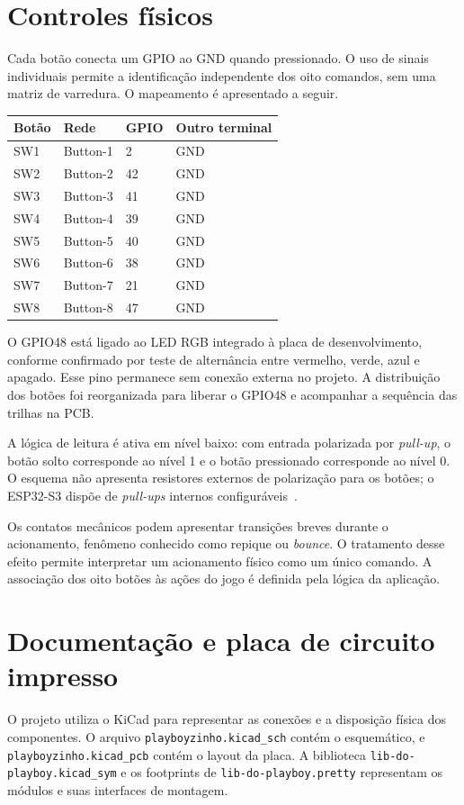 \documentclass[12pt,a4paper]{article}
\begin{document}
\section{Controles físicos}
Cada botão conecta um GPIO ao GND quando pressionado. O uso de sinais individuais permite a identificação independente dos oito comandos, sem uma matriz de varredura. O mapeamento é apresentado a seguir.
\begin{center}
  \begin{tabular}{llll}
    \toprule
    \textbf{Botão} & \textbf{Rede} & \textbf{GPIO} & \textbf{Outro terminal}\\
    \midrule
    SW1 & Button-1 & 2 & GND\\
    SW2 & Button-2 & 42 & GND\\
    SW3 & Button-3 & 41 & GND\\
    SW4 & Button-4 & 39 & GND\\
    SW5 & Button-5 & 40 & GND\\
    SW6 & Button-6 & 38 & GND\\
    SW7 & Button-7 & 21 & GND\\
    SW8 & Button-8 & 47 & GND\\
    \bottomrule
  \end{tabular}
\end{center}

O GPIO48 está ligado ao LED RGB integrado à placa de desenvolvimento, conforme confirmado por teste de alternância entre vermelho, verde, azul e apagado. Esse pino permanece sem conexão externa no projeto. A distribuição dos botões foi reorganizada para liberar o GPIO48 e acompanhar a sequência das trilhas na PCB.

A lógica de leitura é ativa em nível baixo: com entrada polarizada por \textit{pull-up}, o botão solto corresponde ao nível 1 e o botão pressionado corresponde ao nível 0. O esquema não apresenta resistores externos de polarização para os botões; o ESP32-S3 dispõe de \textit{pull-ups} internos configuráveis~\cite{s3}.

Os contatos mecânicos podem apresentar transições breves durante o acionamento, fenômeno conhecido como repique ou \textit{bounce}. O tratamento desse efeito permite interpretar um acionamento físico como um único comando. A associação dos oito botões às ações do jogo é definida pela lógica da aplicação.

\section{Documentação e placa de circuito impresso}
O projeto utiliza o KiCad para representar as conexões e a disposição física dos componentes. O arquivo \texttt{playboyzinho.kicad\_sch} contém o esquemático, e \texttt{playboyzinho.kicad\_pcb} contém o layout da placa. A biblioteca \texttt{lib-do-playboy.kicad\_sym} e os footprints de \texttt{lib-do-playboy.pretty} representam os módulos e suas interfaces de montagem.
\end{document}

